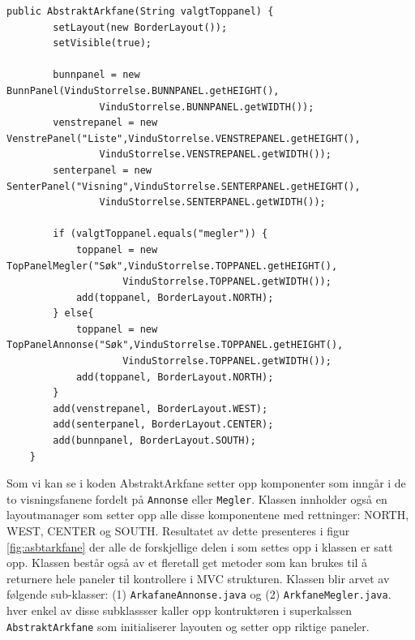\begin{lstlisting}[caption=Konstruktør til \texttt{AbstraktArkfane}. label=kode:arkfane]
    public AbstraktArkfane(String valgtToppanel) {
        setLayout(new BorderLayout());
        setVisible(true);
        
        bunnpanel = new BunnPanel(VinduStorrelse.BUNNPANEL.getHEIGHT(), 
                VinduStorrelse.BUNNPANEL.getWIDTH());
        venstrepanel = new VenstrePanel("Liste",VinduStorrelse.VENSTREPANEL.getHEIGHT(), 
                VinduStorrelse.VENSTREPANEL.getWIDTH());
        senterpanel = new SenterPanel("Visning",VinduStorrelse.SENTERPANEL.getHEIGHT(), 
                VinduStorrelse.SENTERPANEL.getWIDTH());

        if (valgtToppanel.equals("megler")) {
            toppanel = new TopPanelMegler("Søk",VinduStorrelse.TOPPANEL.getHEIGHT(), 
                    VinduStorrelse.TOPPANEL.getWIDTH());
            add(toppanel, BorderLayout.NORTH);
        } else{
            toppanel = new TopPanelAnnonse("Søk",VinduStorrelse.TOPPANEL.getHEIGHT(), 
                    VinduStorrelse.TOPPANEL.getWIDTH());
            add(toppanel, BorderLayout.NORTH);
        }
        add(venstrepanel, BorderLayout.WEST);
        add(senterpanel, BorderLayout.CENTER);
        add(bunnpanel, BorderLayout.SOUTH);
    }
\end{lstlisting}



Som vi kan se i koden AbstraktArkfane setter opp komponenter som inngår i de to visningsfanene fordelt på \texttt{Annonse} eller \texttt{Megler}. Klassen innholder også en layoutmanager som setter opp alle disse komponentene med rettninger: NORTH, WEST, CENTER og SOUTH. Resultatet av dette presenteres i figur \ref{fig:asbtarkfane} der alle de forskjellige delen i som settes opp i klassen er satt opp. Klassen består også av et fleretall get metoder som kan brukes til å returnere hele paneler til kontrollere i MVC strukturen. Klassen blir arvet av følgende sub-klasser: (1) \texttt{ArkafaneAnnonse.java} og (2) \texttt{ArkfaneMegler.java}. hver enkel av disse subklassser kaller opp kontruktøren i superkalssen \texttt{AbstraktArkfane} som initialiserer layouten og setter opp riktige paneler.




